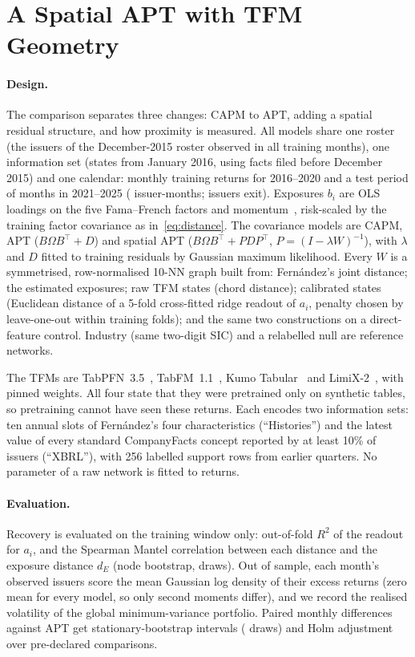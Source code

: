 \documentclass[letterpaper]{article} %
\theoremstyle{definition}
\begin{document}
\section{A Spatial APT with TFM Geometry}\label{sec:apt}
\paragraph{Design.} The comparison separates three changes: CAPM to APT, adding
a spatial residual structure, and how proximity is measured. All models share
one roster (the \ffWAptIssuers{} issuers of the December-2015 roster observed in
all \ffWAptTrainMonths{} training months), one information set (states from
January 2016, using facts filed before December 2015) and one calendar:
monthly training returns for 2016--2020 and a test period of
\ffWAptTestMonths{} months in 2021--2025 (\ffWAptTestIssuerMonths{}
issuer-months; \ffWAptExiting{} issuers exit). Exposures $b_i$ are OLS loadings
on the five Fama--French factors and momentum~\citep{fama2015,carhart1997},
risk-scaled by the training factor covariance as in~\eqref{eq:distance}. The
covariance models are CAPM, APT ($B\Omega B^\top+D$) and spatial APT
($B\Omega B^\top+PDP^\top$, $P=(I-\lambda W)^{-1}$), with $\lambda$ and $D$
fitted to training residuals by Gaussian maximum likelihood. Every $W$ is a
symmetrised, row-normalised 10-NN graph built from: Fern\'andez's joint
distance; the estimated exposures; raw TFM states (chord distance); calibrated
states (Euclidean distance of a 5-fold cross-fitted ridge readout of $a_i$,
penalty chosen by leave-one-out within training folds); and the same two
constructions on a direct-feature control. Industry (same two-digit SIC) and a
relabelled null are reference networks.

The TFMs are TabPFN~3.5~\citep{hollmann2025}, TabFM~1.1~\citep{kong2026tabfm},
Kumo Tabular~\citep{nvidia2026kumo} and LimiX-2~\citep{zhang2026limix}, with
pinned weights. All four state that they were pretrained only on synthetic
tables, so pretraining cannot have seen these returns. Each encodes two
information sets: ten annual slots of Fern\'andez's four characteristics
(``Histories'') and the latest value of every standard CompanyFacts concept
reported by at least 10\% of issuers (``XBRL''), with 256 labelled support
rows from earlier quarters. No parameter of a raw network is fitted to returns.

\paragraph{Evaluation.} Recovery is evaluated on the training window only:
out-of-fold $R^2$ of the readout for $a_i$, and the Spearman Mantel correlation
between each distance and the exposure distance $d_E$ (node bootstrap,
\ffWAptMantelDraws{} draws). Out of sample, each month's observed issuers score
the mean Gaussian log density of their excess returns (zero mean for every
model, so only second moments differ), and we record the realised volatility
of the global minimum-variance portfolio. Paired monthly differences against
APT get stationary-bootstrap intervals (\ffWAptDraws{} draws) and Holm
adjustment over \ffWComparisons{} pre-declared comparisons.
\end{document}
